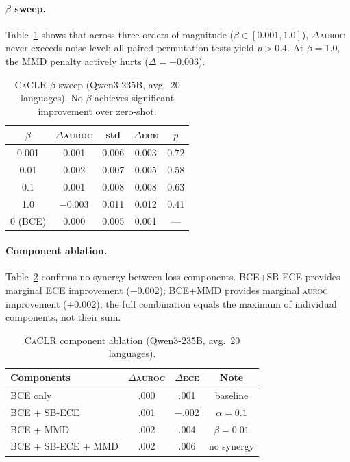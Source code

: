 \documentclass[11pt,a4paper]{article}
\newcommand{\auroc}{\textsc{auroc}}
\newcommand{\ece}{\textsc{ece}}
\newcommand{\caclr}{\textsc{CaCLR}}
\begin{document}
\paragraph{$\beta$ sweep.}
Table~\ref{tab:beta-sweep} shows that across three orders of magnitude ($\beta \in [0.001, 1.0]$), $\Delta$\auroc{} never exceeds noise level; all paired permutation tests yield $p{>}0.4$.
At $\beta{=}1.0$, the MMD penalty actively hurts ($\Delta{=}{-}0.003$).

\begin{table}[t]
\centering
\small
\begin{tabular}{ccccc}
\toprule
$\beta$ & $\Delta$\auroc{} & std & $\Delta$\ece{} & $p$ \\
\midrule
0.001 & 0.001 & 0.006 & 0.003 & 0.72 \\
0.01 & 0.002 & 0.007 & 0.005 & 0.58 \\
0.1 & 0.001 & 0.008 & 0.008 & 0.63 \\
1.0 & $-$0.003 & 0.011 & 0.012 & 0.41 \\
0 (BCE) & 0.000 & 0.005 & 0.001 & --- \\
\bottomrule
\end{tabular}
\caption{\caclr{} $\beta$ sweep (Qwen3-235B, avg.\ 20 languages). No $\beta$ achieves significant improvement over zero-shot.}
\label{tab:beta-sweep}
\end{table}

\paragraph{Component ablation.}
Table~\ref{tab:ablation} confirms no synergy between loss components.
BCE+SB-ECE provides marginal ECE improvement ($-$0.002); BCE+MMD provides marginal \auroc{} improvement (+0.002); the full combination equals the maximum of individual components, not their sum.

\begin{table}[t]
\centering
\small
\begin{tabular}{lccc}
\toprule
\textbf{Components} & $\Delta$\auroc{} & $\Delta$\ece{} & \textbf{Note} \\
\midrule
BCE only & .000 & .001 & baseline \\
BCE + SB-ECE & .001 & $-$.002 & $\alpha{=}0.1$ \\
BCE + MMD & .002 & .004 & $\beta{=}0.01$ \\
BCE + SB-ECE + MMD & .002 & .006 & no synergy \\
\bottomrule
\end{tabular}
\caption{\caclr{} component ablation (Qwen3-235B, avg.\ 20 languages).}
\label{tab:ablation}
\end{table}
\end{document}
